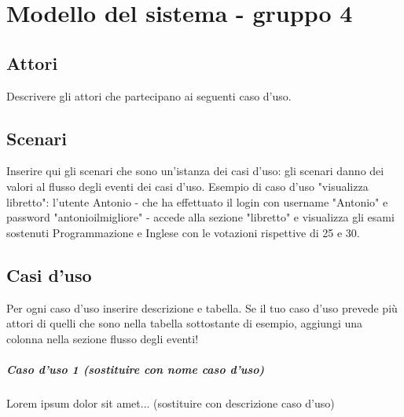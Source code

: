 
\chapter{Modello del sistema - gruppo 4}
\label{ref:modSistemaGruppo4}


\section{Attori}
Descrivere gli attori che partecipano ai seguenti caso d'uso.

\section{Scenari}
Inserire qui gli scenari che sono un'istanza dei casi d'uso: gli scenari danno dei valori al flusso degli eventi dei casi d'uso. Esempio di caso d'uso "visualizza libretto": l'utente Antonio - che ha effettuato il login con username "Antonio" e password "antonioilmigliore" - accede alla sezione "libretto" e visualizza gli esami sostenuti Programmazione e Inglese con le votazioni rispettive di 25 e 30.

\section{Casi d'uso}
Per ogni caso d'uso inserire descrizione e tabella. Se il tuo caso d'uso prevede più attori di quelli che sono nella tabella sottostante di esempio, aggiungi una colonna nella sezione flusso degli eventi!

\paragraph{Caso d'uso 1 (sostituire con nome caso d'uso) \\} 
Lorem ipsum dolor sit amet... (sostituire con descrizione caso d'uso)


